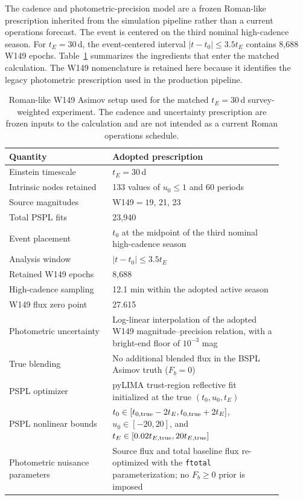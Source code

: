 \documentclass{article}
\begin{document}
The cadence and photometric-precision model are a frozen Roman-like
prescription inherited from the simulation pipeline rather than a current
operations forecast. The event is centered on the third nominal
high-cadence season. For $t_E=30\,$d, the event-centered interval
$|t-t_0|\leq3.5t_E$ contains 8,688 W149 epochs. Table~\ref{tab:roman_setup}
summarizes the ingredients that enter the matched calculation. The W149
nomenclature is retained here because it identifies the legacy
photometric prescription used in the production pipeline.

\begin{table}[H]
\centering
\small
\caption{
Roman-like W149 Asimov setup used for the matched $t_E=30\,$d
survey-weighted experiment. The cadence and uncertainty prescription are
frozen inputs to the calculation and are not intended as a current Roman
operations schedule.
}
\label{tab:roman_setup}
\begin{tabular}{p{0.34\linewidth}p{0.56\linewidth}}
\toprule
Quantity & Adopted prescription \\
\midrule
Einstein timescale & $t_E=30\,$d \\
Intrinsic nodes retained & 133 values of $u_0\leq1$ and 60 periods \\
Source magnitudes & W149$=19$, 21, 23 \\
Total PSPL fits & 23,940 \\
Event placement & $t_0$ at the midpoint of the third nominal high-cadence season \\
Analysis window & $|t-t_0|\leq3.5t_E$ \\
Retained W149 epochs & 8,688 \\
High-cadence sampling & 12.1 min within the adopted active season \\
W149 flux zero point & 27.615 \\
Photometric uncertainty & Log-linear interpolation of the adopted W149 magnitude--precision relation, with a bright-end floor of $10^{-3}$ mag \\
True blending & No additional blended flux in the BSPL Asimov truth ($F_b=0$) \\
PSPL optimizer & pyLIMA trust-region reflective fit initialized at the true $(t_0,u_0,t_E)$ \\
PSPL nonlinear bounds & $t_0\in[t_{0,\rm true}-2t_E,t_{0,\rm true}+2t_E]$, $u_0\in[-20,20]$, and $t_E\in[0.02t_{E,\rm true},20t_{E,\rm true}]$ \\
Photometric nuisance parameters & Source flux and total baseline flux re-optimized with the \texttt{ftotal} parameterization; no $F_b\geq0$ prior is imposed \\
\bottomrule
\end{tabular}
\end{table}
\end{document}
